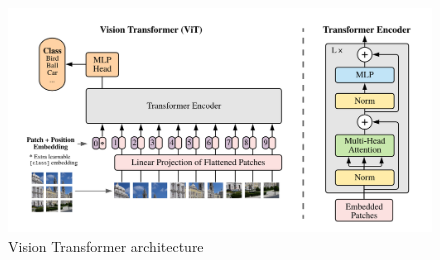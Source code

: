 \begin{figure}
    \centering
    \includegraphics[width=0.8\linewidth]{img/ViT.png}
    \caption[Vision Transformer architecture]{Vision Transformer architecture \cite{dosovitskiy2020image}}
    \label{figure:ViT}
\end{figure}






